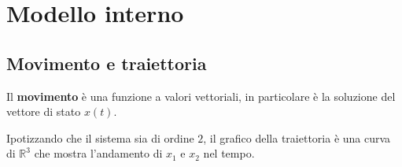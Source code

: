 \chapter{Modello interno}

\section{Movimento e traiettoria}

Il \textbf{movimento} è una funzione a valori vettoriali, in particolare è la soluzione del vettore di stato $x(t)$.

Ipotizzando che il sistema sia di ordine $2$, il grafico della traiettoria è una curva di $\mathbb R^3$ che mostra l'andamento di $x_1$ e $x_2$ nel tempo.


\begin{figure}[htpb]\centering






\begin{tikzpicture}[x=0.75pt,y=0.75pt,yscale=-1,xscale=1]


\end{tikzpicture}
\end{figure}
